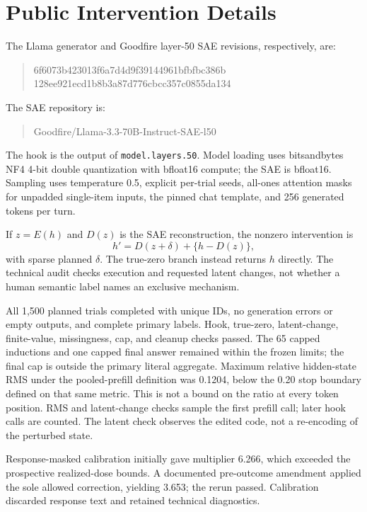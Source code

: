 \documentclass[11pt]{article}
\begin{document}
\section{Public Intervention Details}\label{app:implementation}

The Llama generator and Goodfire layer-50 SAE revisions, respectively, are:
\begin{quote}\small\ttfamily
6f6073b423013f6a7d4d9f39144961bfbfbc386b\\
128ee921ecd1b8b3a87d776cbcc357c0855da134
\end{quote}
The SAE repository is:
\begin{quote}\small\ttfamily
Goodfire/Llama-3.3-70B-Instruct-SAE-l50
\end{quote}
The hook is the output of \texttt{model.layers.50}.
Model loading uses bitsandbytes NF4 4-bit double
quantization with bfloat16 compute; the SAE is bfloat16. Sampling uses
temperature 0.5, explicit per-trial seeds, all-ones attention masks for
unpadded single-item inputs, the pinned chat template, and 256 generated
tokens per turn.

If $z=E(h)$ and $D(z)$ is the SAE reconstruction, the nonzero intervention is
\[
 h'=D(z+\delta)+\{h-D(z)\},
\]
with sparse planned $\delta$. The true-zero branch instead returns $h$
directly. The technical audit checks execution and requested latent changes,
not whether a human semantic label names an exclusive mechanism.

All 1,500 planned trials completed with unique IDs, no generation errors or
empty outputs, and complete primary labels. Hook, true-zero, latent-change,
finite-value, missingness, cap, and cleanup checks passed. The 65 capped
inductions and one capped final answer remained within the frozen limits;
the final cap is outside the primary literal aggregate. Maximum relative
hidden-state RMS under the pooled-prefill definition was 0.1204, below the
0.20 stop boundary defined on that same metric. This is not a bound on the
ratio at every token position. RMS and latent-change
checks sample the first prefill call; later hook calls are counted. The latent
check observes the edited code, not a re-encoding of the perturbed state.

Response-masked calibration initially gave multiplier 6.266, which exceeded
the prospective realized-dose bounds. A documented pre-outcome amendment
applied the sole allowed correction, yielding 3.653; the rerun passed.
Calibration discarded response text and retained technical diagnostics.
\end{document}

